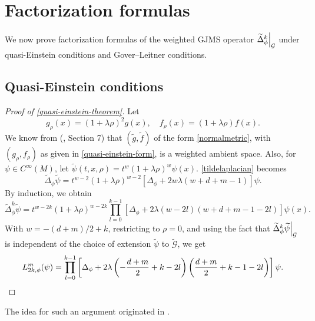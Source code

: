 \documentclass{amsart}
\newcommand\restr[2]{{%
  \left.\kern-\nulldelimiterspace %
  #1 %
  \right|_{#2} %
  }}
\begin{document}




\section{Factorization formulas}
\label{sec:ff}
We now prove factorization formulas of the weighted GJMS operator $\restr{\widetilde{\Delta}_\phi^k}{{\mathcal{G}}}$ under quasi-Einstein conditions and Gover--Leitner conditions.

\subsection{Quasi-Einstein conditions}
\begin{proof}[Proof of \cref{quasi-einstein-theorem}]
Let \begin{equation}\label{quasi-einstein-form}g_\rho(x)=(1+\lambda\rho)^2 g(x),\quad f_\rho(x)=(1+\lambda\rho)f(x).\end{equation} We know from (\cites{CaseKhaitan2022}, Section 7) that $(\widetilde{g},\widetilde{f})$ of the form \cref{normalmetric}, with $(g_\rho,f_\rho)$ as given in \cref{quasi-einstein-form}, is a weighted ambient space.  Also, for $\psi\in C^\infty(M)$, let $\widetilde{\psi}(t,x,\rho)=t^w (1+\lambda\rho)^w \psi(x).$ \cref{tildelaplacian} becomes
\begin{equation*}
    \widetilde{\Delta}_\phi \widetilde{\psi}=t^{w-2}(1+\lambda\rho)^{w-2}\left[\Delta_\phi+2w\lambda(w+d+m-1)\right]\psi.
\end{equation*}
By induction, we obtain
\begin{equation*}
\widetilde{\Delta}^k_\phi\widetilde{\psi}= t^{w-2k}(1+\lambda\rho)^{w-2k}\prod\limits_{l=0}^{k-1}\left[\Delta_\phi+2\lambda(w-2l)(w+d+m-1-2l)\right]\psi(x).
\end{equation*}
With $w=-(d+m)/2+k$, restricting to $\rho=0$, and using the fact that $\restr{\widetilde{\Delta}^k_\phi\widetilde{\psi}}{\mathcal{G}}$ is independent of the choice of extension $\widetilde{\psi}$ to $\widetilde{\mathcal{G}}$, we get 
\begin{equation*}
L^m_{2k,\phi}(\psi)=\prod_{l=0}^{k-1}\left[\Delta_\phi+2\lambda\left(-\frac{d+m}{2}+k-2l\right)\left(\frac{d+m}{2}+k-1-2l\right)\right]\psi.\qedhere
\end{equation*} 
\end{proof}
The idea for such an argument originated in \cites{Matsumoto2013}.
\end{document}
